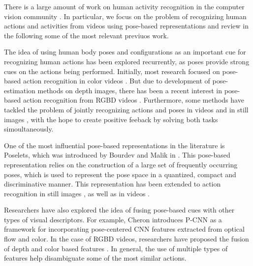 There is a large amount of work on human activity recognition in the computer
vision community
\cite{Aggarwal2011,Poppe2010,vishwakarma2013survey,weinland2011survey}.
In particular, we focus on the problem of recognizing human actions and
activities from videos using pose-based representations and review in the
following some of the most relevant previuos work.

The idea of using human body poses and configurations as an important
cue for recognizing human actions has been explored recurrently,
as poses provide strong cues on the actions
being performed.
Initially, most research focused on pose-based action recognition in color
videos \cite{Feng2002, Thurau2008}.
But due to development of pose-estimation
methods on depth images\cite{Shotton:EtAl:11}, there has been a recent interest in
pose-based action recognition from RGBD videos
\cite{Escorcia2012, Hu2015, Vemulapalli2014}.
Furthermore, some methods have tackled the problem of jointly recognizing
actions and poses in videos \cite{Nie2015} and in still images \cite{Yao2010},
with the hope to create positive feeback by solving both tasks simoultaneously.

One of the most influential pose-based representations in the literature
is Poselets, which was introduced by Bourdev and Malik in \cite{Bourdev2009}.
This pose-based representation relies on the construction of a large set of
frequently occurring poses, which is used to represent the pose space in a
quantized, compact and discriminative manner.
This representation has been extended to action recognition in still
images \cite{maji2011action},
as well as in videos \cite{Tao2015, Wang2014,Zanfir2013}.


Researchers have also explored the idea of fusing pose-based cues with
other types of visual descriptors. For example, Cheron \etal \cite{Cheron2015}
introduces P-CNN as a framework for incorporating pose-centered
CNN features extracted from optical flow and color.
In the case of RGBD videos, researchers have proposed the fusion
of depth and color based features \cite{Hu2015, Kong2015}.
In general, the use of multiple types of features help disambiguate some
of the most similar actions.

